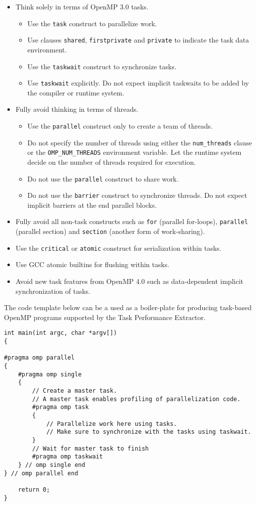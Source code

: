 \documentclass[11pt,a4paper]{article}
\begin{document}
\begin{itemize}
    \item Think solely in terms of OpenMP 3.0 tasks.
    \begin{itemize}
        \item Use the \texttt{task} construct to parallelize work.
        \item Use clauses \texttt{shared}, \texttt{firstprivate} and \texttt{private} to indicate the task data environment.
        \item Use the \texttt{taskwait} construct to synchronize tasks.
        \item Use \texttt{taskwait} explicitly. Do not expect implicit taskwaits to be added by the compiler or runtime system.
    \end{itemize}
    \item Fully avoid thinking in terms of threads.
    \begin{itemize}
        \item Use the \texttt{parallel} construct only to create a team of threads.
        \item Do not specify the number of threads using either the \texttt{num\_threads} clause or the \texttt{OMP\_NUM\_THREADS} environment variable. Let the runtime system decide on the number of threads required for execution.
        \item Do not use the \texttt{parallel} construct to share work.
        \item Do not use the \texttt{barrier} construct to synchronize threads. Do not expect implicit barriers at the end parallel blocks.
    \end{itemize}
\item Fully avoid all non-task constructs such as \texttt{for} (parallel for-loops), \texttt{parallel} (parallel section) and \texttt{section} (another form of work-sharing).
\item Use the \texttt{critical} or \texttt{atomic} construct for serialization within tasks.
    \item Use GCC atomic builtins for flushing within tasks.
    \item Avoid new task features from OpenMP 4.0 such as data-dependent implicit synchronization of tasks.
\end{itemize}

The code template below can be a used as a boiler-plate for producing task-based OpenMP programs supported by the Task Performance Extractor.

\begin{lstlisting}[style=MyCStyle]
int main(int argc, char *argv[])
{

#pragma omp parallel
{
    #pragma omp single
    {
        // Create a master task.
        // A master task enables profiling of parallelization code.
        #pragma omp task
        {
            // Parallelize work here using tasks.
            // Make sure to synchronize with the tasks using taskwait.
        }
        // Wait for master task to finish
        #pragma omp taskwait
    } // omp single end
} // omp parallel end

    return 0;
}
\end{lstlisting}
\end{document}
